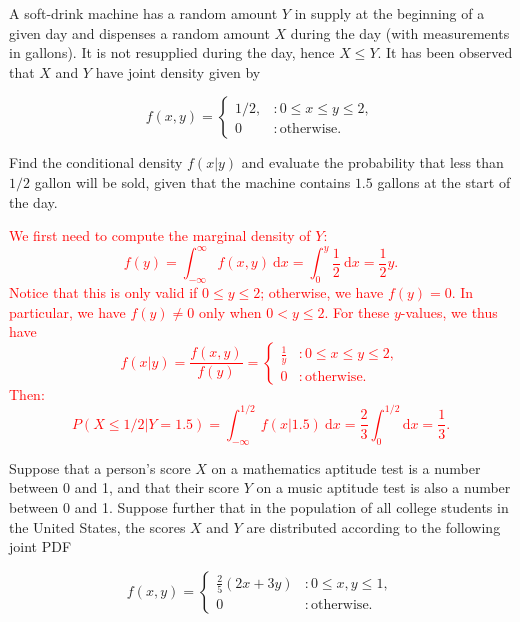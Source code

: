 \documentclass[12pt,reqno]{amsart}
\begin{document}
\bigskip
\prob A soft-drink machine has a random amount $Y$ in supply at the beginning of a given day and dispenses a random amount $X$ during the day (with measurements in gallons). It is not resupplied during the day, hence $X\leq Y$. It has been observed that $X$ and $Y$ have joint density given by

    \[f(x,y) = \begin{cases}
        1/2, & : 0 \leq x \leq y \leq 2, \\
        0 & : \text{otherwise}.
    \end{cases}\]

Find the conditional density $f(x|y)$ and evaluate the probability that less than $1/2$ gallon will be sold, given that the machine contains $1.5$ gallons at the start of the day.

\bigskip
\textcolor{red}{We first need to compute the marginal density of $Y$:
    \[f(y) = \int_{-\infty}^\infty f(x,y) \ \text{d}x = \int_0^y \frac{1}{2} \ \text{d}x = \frac{1}{2}y. \]
Notice that this is only valid if $0\leq y \leq 2$; otherwise, we have $f(y) = 0$. In particular, we have $f(y)\neq 0$ only when $0 < y \leq 2$. For these $y$-values, we thus have
    \[f(x|y) = \frac{f(x,y)}{f(y)} = \begin{cases}
        \frac{1}{y} & : 0 \leq x \leq y \leq 2, \\
        0 & : \text{otherwise}.
    \end{cases}\]
Then:
    \[P(X\leq 1/2 | Y = 1.5 ) = \int_{-\infty}^{1/2} f(x|1.5) \ \text{d} x = \frac{2}{3} \int_{0}^{1/2} \text{d}x = \frac{1}{3}. \]}












\bigskip
\prob Suppose that a person’s score $X$ on a mathematics aptitude test is a number between 0 and 1, and that their score $Y$ on a music aptitude test is also a number between 0 and 1. Suppose further that in the population of all college students in the United States, the scores $X$ and $Y$ are distributed according to the following joint PDF

	\[f(x,y) = \begin{cases}
	\frac{2}{5} (2x+3y) & : 0\leq x,y \leq 1, \\
	0 & : \text{otherwise}.
	\end{cases}
	\]
\end{document}
